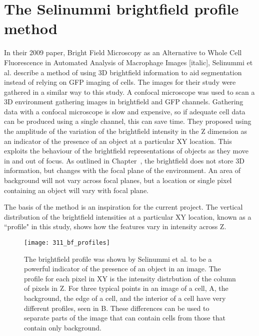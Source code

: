 \section{The Selinummi brightfield profile method}

In their 2009 paper, Bright Field Microscopy as an Alternative to Whole Cell Fluorescence in Automated Analysis of Macrophage Images [italic], Selinummi et al. describe a method of using 3D brightfield information to aid segmentation instead of relying on GFP imaging of cells. The images for their study were gathered in a similar way to this study. A confocal microscope was used to scan a 3D environment gathering images in brightfield and GFP channels. Gathering data with a confocal microscope is slow and expensive, so if adequate cell data can be produced using a single channel, this can save time. They proposed using the amplitude of the variation of the brightfield intensity in the Z dimension as an indicator of the presence of an object at a particular XY location. This exploits the behaviour of the brightfield representations of objects as they move in and out of focus. As outlined in Chapter~\cite{}, the brightfield does not store 3D information, but changes with the focal plane of the environment. An area of background will not vary across focal planes, but a location or single pixel containing an object will vary with focal plane.

The basis of the method is an inspiration for the current project. The vertical distribution of the brightfield intensities at a particular XY location, known as a ``profile" in this study, shows how the features vary in intensity across Z.

\begin{figure}[h!]
 \centering
 \texttt{[image: 311\_bf\_profiles]}
 \caption[Selinummi brightfield profile]{
 	The brightfield profile was shown by Selinummi et al. to be a powerful indicator of the presence of an object in an image. The profile for each pixel in XY is the intensity distrbution of the column of pixels in Z. For three typical points in an image of a cell, A, the background, the edge of a cell, and the interior of a cell have very different profiles, seen in B. These differences can be used to separate parts of the image that can contain cells from those that contain only background.
 }
 \label{fig:brightfieldprofile}
\end{figure}

